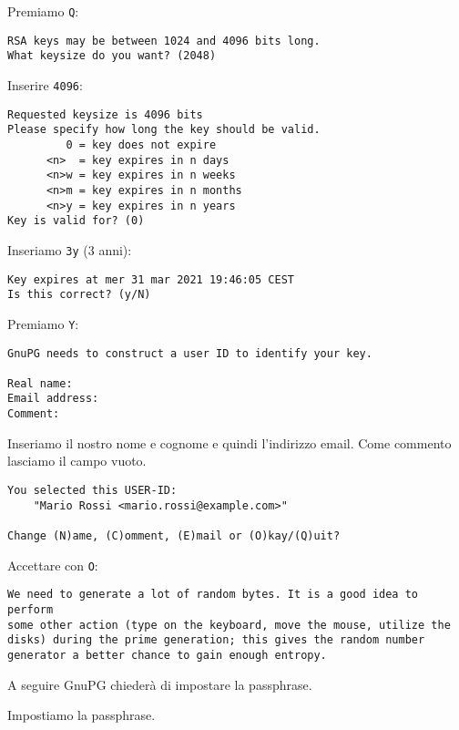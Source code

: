 \documentclass[a4paper,10pt]{article}
\begin{document}
Premiamo \texttt{Q}:

\begin{verbatim}
RSA keys may be between 1024 and 4096 bits long.
What keysize do you want? (2048)
\end{verbatim}


Inserire \texttt{4096}:

\begin{verbatim}
Requested keysize is 4096 bits
Please specify how long the key should be valid.
         0 = key does not expire
      <n>  = key expires in n days
      <n>w = key expires in n weeks
      <n>m = key expires in n months
      <n>y = key expires in n years
Key is valid for? (0)
\end{verbatim}


Inseriamo \texttt{3y} (3 anni):

\begin{verbatim}
Key expires at mer 31 mar 2021 19:46:05 CEST
Is this correct? (y/N)
\end{verbatim}

Premiamo \texttt{Y}:

\begin{verbatim}
GnuPG needs to construct a user ID to identify your key.

Real name:
Email address:
Comment:
\end{verbatim}


Inseriamo il nostro nome e cognome e quindi l'indirizzo email.
Come commento lasciamo il campo vuoto.

\begin{verbatim}
You selected this USER-ID:
    "Mario Rossi <mario.rossi@example.com>"

Change (N)ame, (C)omment, (E)mail or (O)kay/(Q)uit?
\end{verbatim}

Accettare con \texttt{O}:

\begin{verbatim}
We need to generate a lot of random bytes. It is a good idea to perform
some other action (type on the keyboard, move the mouse, utilize the
disks) during the prime generation; this gives the random number
generator a better chance to gain enough entropy.
\end{verbatim}

A seguire GnuPG chiederà di impostare la passphrase.

Impostiamo la passphrase.
\end{document}
